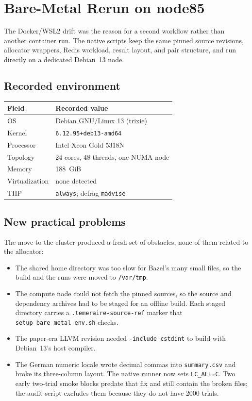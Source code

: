 \documentclass[a4paper,11pt]{article}
\begin{document}
\section{Bare-Metal Rerun on node85}
\label{sec:bare-metal}

The Docker/WSL2 drift was the reason for a second workflow rather than another
container run. The native scripts keep the same pinned source revisions,
allocator wrappers, Redis workload, result layout, and pair structure, and run
directly on a dedicated Debian~13 node.

\subsection{Recorded environment}

\begin{center}
\begin{tabular}{@{}ll@{}}
\toprule
Field & Recorded value \\
\midrule
OS & Debian GNU/Linux 13 (trixie) \\
Kernel & \texttt{6.12.95+deb13-amd64} \\
Processor & Intel Xeon Gold 5318N \\
Topology & 24 cores, 48 threads, one NUMA node \\
Memory & 188~GiB \\
Virtualization & none detected \\
THP & \texttt{always}; defrag \texttt{madvise} \\
\bottomrule
\end{tabular}
\end{center}

\subsection{New practical problems}

The move to the cluster produced a fresh set of obstacles, none of them related
to the allocator:

\begin{itemize}[leftmargin=1.5em]
  \item The shared home directory was too slow for Bazel's many small files, so
  the build and the runs were moved to \texttt{/var/tmp}.
  \item The compute node could not fetch the pinned sources, so the source and
  dependency archives had to be staged for an offline build. Each staged
  directory carries a \texttt{.temeraire-source-ref} marker that
  \texttt{setup\_bare\_metal\_env.sh} checks.
  \item The paper-era LLVM revision needed \texttt{-include cstdint} to build
  with Debian~13's host compiler.
  \item The German numeric locale wrote decimal commas into \texttt{summary.csv}
  and broke its three-column layout. The native runner now sets
  \texttt{LC\_ALL=C}. Two early two-trial smoke blocks predate that fix and
  still contain the broken files; the audit script excludes them because they
  do not have 2000 trials.
\end{itemize}
\end{document}
